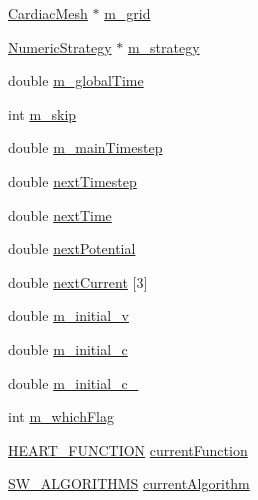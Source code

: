 \begin{DoxyCompactItemize}
\item 
\hyperlink{class_cardiac_mesh}{Cardiac\+Mesh} $\ast$ \hyperlink{class_atrial_machine2d_ae5a4568a32980b04648791e7ac5e3249}{m\+\_\+grid}
\item 
\hyperlink{class_numeric_strategy}{Numeric\+Strategy} $\ast$ \hyperlink{class_atrial_machine2d_afa218ce1cafcf45895c0317953b97977}{m\+\_\+strategy}
\item 
double \hyperlink{class_atrial_machine2d_a951f2f5f1bee9505ee93df61121bf5d2}{m\+\_\+global\+Time}
\item 
int \hyperlink{class_atrial_machine2d_a08a7d022fbd6733e52775651b5f139dc}{m\+\_\+skip}
\item 
double \hyperlink{class_atrial_machine2d_a792a54d1811f886bf93f9546aac0120f}{m\+\_\+main\+Timestep}
\item 
double \hyperlink{class_atrial_machine2d_aa279d4e4ab1193bb6c358541d52424ff}{next\+Timestep}
\item 
double \hyperlink{class_atrial_machine2d_a8f3931073e39c8c188d5ca65631b704b}{next\+Time}
\item 
double \hyperlink{class_atrial_machine2d_a50c29aa024f47633087f27e0f70607cf}{next\+Potential}
\item 
double \hyperlink{class_atrial_machine2d_ae037f3658a7c3f9af7e05cd19a0a94b7}{next\+Current} \mbox{[}3\mbox{]}
\item 
double \hyperlink{class_atrial_machine2d_af93ce7ff7615bf27467eb765623c720c}{m\+\_\+initial\+\_\+v}
\item 
double \hyperlink{class_atrial_machine2d_a5ff92394b2f3e615b7c36c8adf7286d6}{m\+\_\+initial\+\_\+c}
\item 
double \hyperlink{class_atrial_machine2d_a14baf4c478ff64494b38eee78955a472}{m\+\_\+initial\+\_\+c\+\_}
\item 
int \hyperlink{class_atrial_machine2d_a74ecd78d3016ae5a6a5c6004aa43ad96}{m\+\_\+which\+Flag}
\item 
\hyperlink{heart_defines_8h_a2e6f185296f039d4680b50804849b9d9}{H\+E\+A\+R\+T\+\_\+\+F\+U\+N\+C\+T\+I\+O\+N} \hyperlink{class_atrial_machine2d_a15d1c77b3cd28c073e221905f4cc6493}{current\+Function}
\item 
\hyperlink{heart_defines_8h_ae0e356ca8deebb30aca0cd91e0cbd46c}{S\+W\+\_\+\+A\+L\+G\+O\+R\+I\+T\+H\+M\+S} \hyperlink{class_atrial_machine2d_a57773395f154207dbbac601624586559}{current\+Algorithm}
\end{DoxyCompactItemize}


